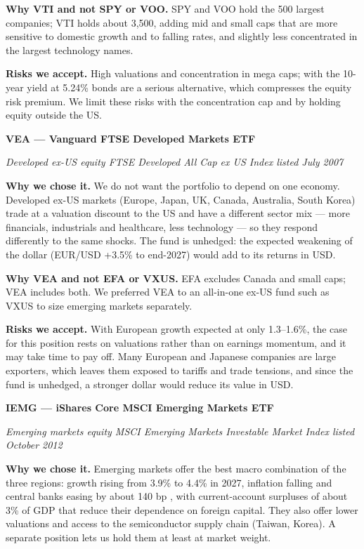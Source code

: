 \textbf{Why VTI and not SPY or VOO.} SPY and VOO hold the 500 largest
companies; VTI holds about 3,500, adding mid and small caps that are
more sensitive to domestic growth and to falling rates, and slightly
less concentrated in the largest technology names.

\textbf{Risks we accept.} High valuations and concentration in mega
caps; with the 10-year yield at 5.24\% bonds are a serious alternative,
which compresses the equity risk premium. We limit these risks with the
concentration cap and by holding equity outside the US.

\textbf{VEA --- Vanguard FTSE Developed Markets ETF}

\emph{Developed ex-US equity \textperiodcentered{} FTSE Developed All Cap ex US Index \textperiodcentered{}
listed July 2007}

\textbf{Why we chose it.} We do not want the portfolio to depend on one
economy. Developed ex-US markets (Europe, Japan, UK, Canada, Australia,
South Korea) trade at a valuation discount to the US and have a
different sector mix --- more financials, industrials and healthcare,
less technology --- so they respond differently to the same shocks. The
fund is unhedged: the expected weakening of the dollar (EUR/USD +3.5\%
to end-2027) would add to its returns in USD.

\textbf{Why VEA and not EFA or VXUS.} EFA excludes Canada and small
caps; VEA includes both. We preferred VEA to an all-in-one ex-US fund
such as VXUS to size emerging markets separately.

\textbf{Risks we accept.} With European growth expected at only
1.3--1.6\%, the case for this position rests on valuations rather than
on earnings momentum, and it may take time to pay off. Many European and
Japanese companies are large exporters, which leaves them exposed to
tariffs and trade tensions, and since the fund is unhedged, a stronger
dollar would reduce its value in USD.

\textbf{IEMG --- iShares Core MSCI Emerging Markets ETF}

\emph{Emerging markets equity \textperiodcentered{} MSCI Emerging Markets Investable Market
Index \textperiodcentered{} listed October 2012}

\textbf{Why we chose it.} Emerging markets offer the best macro
combination of the three regions: growth rising from 3.9\% to 4.4\% in
2027, inflation falling and central banks easing by about 140 bp
\cite{ecfc}, with current-account surpluses of about 3\% of GDP that reduce
their dependence on foreign capital. They also offer lower valuations
and access to the semiconductor supply chain (Taiwan, Korea). A separate
position lets us hold them at least at market weight.

